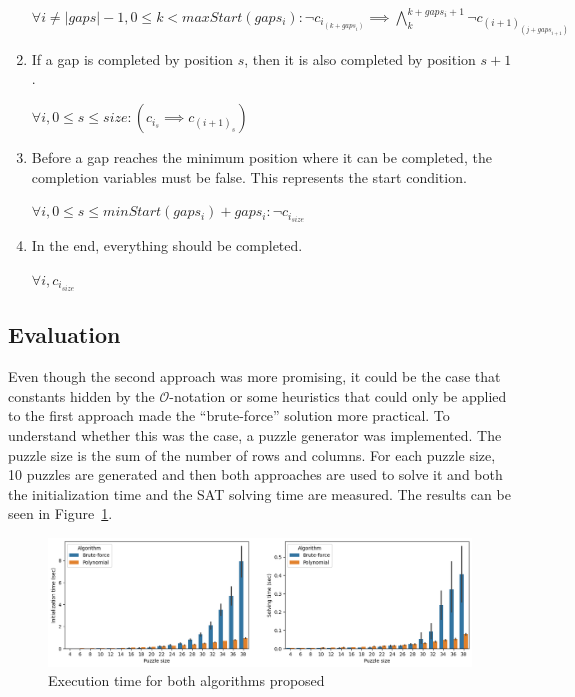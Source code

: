 \documentclass[12pt]{article}
\begin{document}
\begin{enumerate}
  \begin{center}
    $\forall i \ne |gaps|-1, 0 \le k < maxStart(gaps_i): \neg c_i_{(k+gaps_i)} \implies \bigwedge_k^{k+gaps_i+1} \neg c_{(i+1)}_{(j + gaps_{i+1})}$
  \end{center}

  \item If a gap is completed by position $s$, then it is also completed by position $s+1$.
  \begin{center}
    $\forall i, 0 \le s \le size: (c_i_s \implies c_{(i+1)}_s) $
  \end{center}

  \item Before a gap reaches the minimum position where it can be completed, the completion variables must be false. This represents the start condition.
  \begin{center}
    $\forall i, 0 \le s \le minStart(gaps_i)+gaps_i: \neg c_i_{size}$
  \end{center}

  \item In the end, everything should be completed.

  \begin{center}
    $\forall i, c_i_{size}$
  \end{center}
\end{enumerate}

\subsection*{Evaluation}

Even though the second approach was more promising, it could be the case that constants hidden by the $\mathcal{O}$-notation or some heuristics that could only be applied to the first approach made the ``brute-force'' solution more practical.
To understand whether this was the case, a puzzle generator was implemented.
The puzzle size is the sum of the number of rows and columns.
For each puzzle size, 10 puzzles are generated and then both approaches are used to solve it and both the initialization time and the SAT solving time are measured.
The results can be seen in Figure~\ref{fig:bench}. %

\begin{figure}[H]
  \includegraphics[scale=0.5]{bench.png}
  \centering
  \caption{Execution time for both algorithms proposed}
  \label{fig:bench}
\end{figure}
\end{document}
